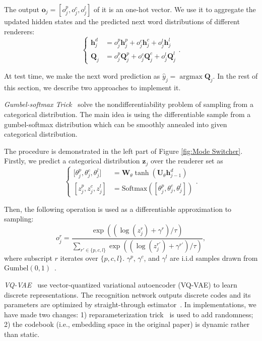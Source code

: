 \documentclass[letterpaper]{article} %
\begin{document}
	The output $\mathbf{o}_j = [o_j^p, o_j^c, o_j^l]$ of it is an one-hot vector. We use it to aggregate the updated hidden states and the predicted next word distributions of different renderers:
	\begin{equation}
	\label{equ:Equation 11}
	\left\{\begin{aligned}
	\mathbf{h}^d_j & = o_j^p\mathbf{h}_j^p + o_j^c\mathbf{h}_j^c + o_j^l\mathbf{h}_j^l \\
	\mathbf{Q}_j & = o_j^p\mathbf{Q}_j^p + o_j^c\mathbf{Q}_j^c + o_j^l\mathbf{Q}_j^l
	\end{aligned}\right..
	\end{equation}
	
	At test time, we make the next word prediction as $\hat{y}_j = \mathop{\arg\max} \mathbf{Q}_j$.  In the rest of this section, we describe two approaches to implement it.
	
	\textit{Gumbel-softmax Trick}~\citep{jang2016categorical} solve the nondifferentiability problem of sampling from a categorical distribution. The main idea is using the differentiable sample from a gumbel-softmax distribution which can be smoothly annealed into given categorical distribution.
	
	The procedure is demonstrated in the left part of Figure \ref{fig:Mode Switcher}. Firstly, we predict a categorical distribution $\mathbf{z}_j$ over the renderer set as
	\begin{equation}
	\label{equ: Equation 12} 
	\left\{\begin{aligned}
	\mathrm{[} \theta_j^p, \theta_j^c, \theta_j^l ] & = \mathbf{W}_\theta\tanh(\mathbf{U}_\theta\mathbf{h}^d_{j-1}) \\
	[ z_j^p, z_j^c, z_j^l ] & = \mathrm{Softmax}([ \theta_j^p, \theta_j^c, \theta_j^l ])
	\end{aligned}\right..
	\end{equation} 
	
	Then, the following operation is used as a differentiable approximation to sampling: 
	\begin{equation}
	o_j^r = \frac{\exp((\log(z_j^r) + \gamma^r) / \tau)}{\sum_{r' \in \{p, c, l\}} \exp((\log(z_j^{r'}) + \gamma^{r'}) / \tau)},
	\end{equation}
	where subscript $r$ iterates over $\{p, c, l\}$. $\gamma^p$, $\gamma^c$, and $\gamma^l$ are i.i.d  samples drawn from $\mathrm{Gumbel}(0, 1)$~\citep{gumbel1948statistical}.
	
	\textit{VQ-VAE}~\citep{van2017neural} use vector-quantized variational autoencoder (VQ-VAE) to learn discrete representations. The recognition network outputs discrete codes and its parameters are optimized by straight-through estimator~\citep{bengio2013estimating}. In implementations, we have made two changes: 1) reparameterization trick~\citep{kingma2013auto} is used to add randomness; 2) the codebook (i.e., embedding space in the original paper) is dynamic rather than static. 
	
\end{document}
